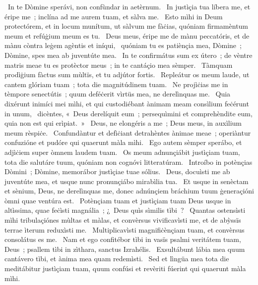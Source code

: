 ~In te Dòmine sperávi, non confùndar in aetèrnum. 
~In justìçia tua líbera me, et éripe me~; inclína ad me aurem tuam, et sàlva me. 
~Esto mìhi in Deum protectórem, et in locum munítum, ut sàlvum me fàċias, quóniam firmamèntum meum et refúġium meum es tu. 
~Deus meus, éripe me de mànu peccatóris, et de mànu còntra leġem agèntis et iníqui, 
~quóniam tu es patiènçia mea, Dòmine~; Dòmine, spes mea ab juventúte mea. 
~In te confirmátus sum ex útero~; de vèntre matris meae tu es protèctor meus~; in te cantáçio mea sèmper. 
~Tàmquam prodìġium fàctus sum mùltïs, et tu adjútor fortis. 
~Repleátur os meum laude, ut cantem glóriam tuam~; tota die magnitúdinem tuam. 
~Ne projìċias me in tèmpore senectútis~; quum deféċerit vìrtüs mea, ne derelìnquas me. 
~Quia dixérunt inimíci mei mìhi, et qui custodiébant ànimam meam consìlium feċérunt in unum, 
~dicèntes, «~Deus derelíquit eum~; persequìmini et comprehèndite eum, quia non est qui erìpiat.~»
~Deus, ne elongéris a me~; Deus meus, in auxìlium meum rèspiċe. 
~Confundàntur et defìċiant detrahèntes ànimae meae~; operiàntur confuzióne et pudóre qui quaerunt màla mìhi. 
~Ego autem sèmper sperábo, et adjìċiem super òmnem laudem tuam. 
~Os meum adnunçiábit justìçiam tuam, tota die salutáre tuum, quóniam non cognóvi litteratúram. 
~Introíbo in potènçias Dòmini~; Dòmine, memorábor justìçiae tuae sólius. 
~Deus, docuìsti me ab juventúte mea, et usque nunc pronunçiábo mirabìlia tua. 
~Et usque in senèctam et sènium, Deus, ne derelìnquas me, donec adnúnçiem bráchium tuum ġeneraçióni òmni quae ventúra est. 
~Potènçiam tuam et justìçiam tuam Deus usque in altìssima, quae feċìsti magnália~; ¿~Deus quìs sìmilis tìbi~? 
~Quantas ostensìsti mìhi tribulaçiónes mùltas et màlas, et convèrsus vivificavìsti me, et de abỳssïs terrae ìterum reduxìsti me. 
~Multiplicavìsti magnifiċènçiam tuam, et convèrsus consolátus es me. 
~Nam et ego confitébor tìbi in vasïs psalmi veritátem tuam, Deus~; psallem tìbi in zìthara, sanctus Izrahélis. 
~Exsultábunt lábia mea quum cantávero tìbi, et ànima mea quam redemìsti. 
~Sed et lìngüa mea tota die meditábitur justìçiam tuam, quum confúsi et revèriti fúerint qui quaerunt màla mìhi. 
